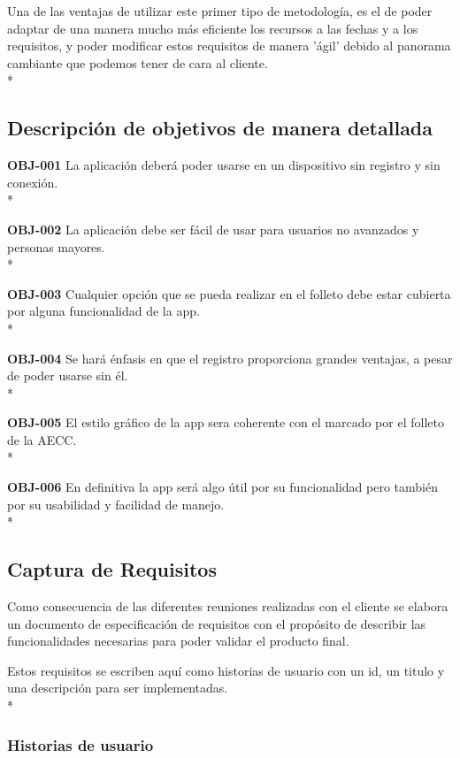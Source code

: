 \documentclass[../pfc.tex]{subfiles}
\begin{document}
	Una de las ventajas de utilizar este primer tipo de metodología, es el de poder adaptar de una manera mucho más eficiente los recursos a las fechas y a los requisitos, y poder modificar estos requisitos de manera 'ágil' debido al panorama cambiante que podemos tener de cara al cliente.\\*
			
		
	\subsection{Descripción de objetivos de manera detallada}
	
	
	\textbf{OBJ-001}	La aplicación deberá poder usarse en un dispositivo sin registro y sin conexión.\\*
	
	\textbf{OBJ-002}	La aplicación debe ser fácil de usar para usuarios no avanzados y personas mayores.\\*
	
	\textbf{OBJ-003}	Cualquier opción que se pueda realizar en el folleto debe estar cubierta por alguna funcionalidad de la app.\\*
	
	\textbf{OBJ-004}	Se hará énfasis en que el registro proporciona grandes ventajas, a pesar de poder usarse sin él.\\*

	\textbf{OBJ-005}	El estilo gráfico de la app sera coherente con el marcado por el folleto de la AECC.\\*
	
	\textbf{OBJ-006}	En definitiva la app será algo útil por su funcionalidad pero también por su usabilidad y facilidad de manejo.\\*
	
	
	\subsection{Captura de Requisitos}
	
	Como consecuencia de las diferentes reuniones realizadas con el cliente se elabora un documento de especificación de requisitos con el propósito de describir las funcionalidades necesarias para poder validar el producto final.
	
	Estos requisitos se escriben aquí como historias de usuario con un id, un titulo y una descripción para ser implementadas. \\*
	
	\subsubsection{Historias de usuario}
			
\end{document}
